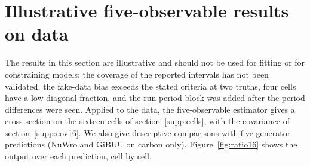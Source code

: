 \section{Illustrative five-observable results on data}
\label{supp:output}
The results in this section are illustrative and should not be used for fitting or for constraining models: the coverage of the reported intervals has not been validated, the fake-data bias exceeds the stated criteria at two truths, four cells have a low diagonal fraction, and the run-period block was added after the period differences were seen. Applied to the data, the five-observable estimator gives a cross section on the sixteen cells of section~\ref{supp:cells}, with the covariance of section~\ref{supp:cov16}. We also give descriptive comparisons with five generator predictions (NuWro and GiBUU on carbon only). Figure~\ref{fig:ratio16} shows the output over each prediction, cell by cell.
